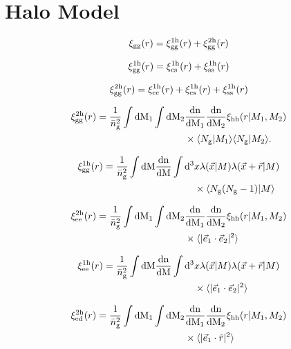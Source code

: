 \documentclass[fleqn,usenatbib]{mnras}
\newcommand{\beq}{\begin{eqnarray}}
\newcommand{\eeq}{\end{eqnarray}}
\newcommand{\tpcf}[1]{\xi_{\rm #1}}
\newcommand{\tpcftwo}[2]{\xi_{\rm #1}^{\rm #2}}
\newcommand{\dd}{\rm d}
\newcommand{\mean}[1]{\langle #1 \rangle}
\newcommand{\meantwo}[2]{\langle #1 \vert #2 \rangle}
\begin{document}
\section{Halo Model}

\beq
\tpcf{gg}(r) = \tpcftwo{gg}{1h}(r) + \tpcftwo{gg}{2h}(r)
\eeq

\beq
\tpcftwo{gg}{1h}(r) = \tpcftwo{cs}{1h}(r) + \tpcftwo{ss}{1h}(r) 
\eeq

\beq
\tpcftwo{gg}{2h}(r) =  \tpcftwo{cc}{1h}(r) + \tpcftwo{cs}{1h}(r) + \tpcftwo{ss}{1h}(r) 
\eeq

\begin{align}
\begin{split}
\tpcftwo{gg}{2h}(r) =   \frac{1}{\bar{n}_{\rm g}^{2}}\int\dd M_1 \int\dd M_2 & \frac{\rm dn}{\dd M_1}\frac{\rm dn}{\dd M_2} \tpcf{hh}(r\vert M_1, M_2) \\& \times  \meantwo{N_{\rm g}}{M_1} \meantwo{N_{\rm g}}{M_2}. 
\end{split}
\end{align}

\begin{align}
\begin{split}
\tpcftwo{gg}{1h}(r) =  \frac{1}{\bar{n}_{\rm g}^{2}} \int\dd M \frac{\rm dn}{\dd M} \int\dd^{3}& x\lambda(\vec{x}\vert M)\lambda(\vec{x}+\vec{r}\vert M)\\ & \times  \meantwo{N_{\rm g}(N_{\rm g}-1)}{M}
\end{split}
\end{align}

\begin{align}
\begin{split}
\tpcftwo{ee}{2h}(r) =   \frac{1}{\bar{n}_{\rm g}^{2}}\int\dd M_1 \int\dd M_2 & \frac{\rm dn}{\dd M_1}\frac{\rm dn}{\dd M_2} \tpcf{hh}(r\vert M_1, M_2) \\& \times  \mean{\vert\vec{e}_{1}\cdot\vec{e}_{2}\vert^{2}}
\end{split}
\end{align}

\begin{align}
\begin{split}
\tpcftwo{ee}{1h}(r) =  \frac{1}{\bar{n}_{\rm g}^{2}} \int\dd M \frac{\rm dn}{\dd M} \int\dd^{3}& x\lambda(\vec{x}\vert M)\lambda(\vec{x}+\vec{r}\vert M)\\ & \times  \mean{\vert\vec{e}_{1}\cdot\vec{e}_{2}\vert^{2}}
\end{split}
\end{align}

\begin{align}
\begin{split}
\tpcftwo{ed}{2h}(r) =   \frac{1}{\bar{n}_{\rm g}^{2}}\int\dd M_1 \int\dd M_2 & \frac{\rm dn}{\dd M_1}\frac{\rm dn}{\dd M_2} \tpcf{hh}(r\vert M_1, M_2) \\& \times  \mean{\vert\vec{e}_{1}\cdot\hat{r}\vert^{2}}
\end{split}
\end{align}
\end{document}
